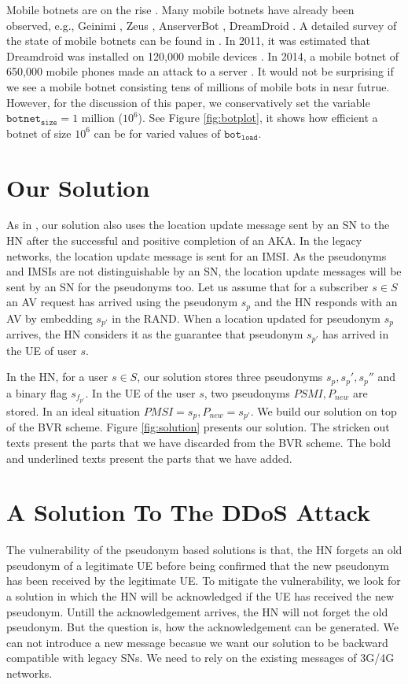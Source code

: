 \documentclass{llncs} %
\begin{document}
Mobile botnets are on the rise \cite{botnet_ccs09_symbian,botnet_usenix11,botnet_australia_2016}. Many mobile botnets have already been observed, e.g., Geinimi \cite{botnet_geinimi10}, Zeus \cite{botnet_zeus11}, AnserverBot \cite{botnet_anserverbot}, DreamDroid \cite{botnet_dreamdroid11}. A detailed survey of the state of mobile botnets can be found in \cite{botnet_threat15}. In 2011, it was estimated that Dreamdroid was installed on 120,000 mobile devices \cite{botnet_dreamdroid11}. In 2014, a mobile botnet of 650,000 mobile phones made an attack to a server \cite{chinese_spam}. It would not be surprising if we see a mobile botnet consisting tens of millions of mobile bots in near futrue. However, for the discussion of this paper, we conservatively set the variable $\texttt{botnet}_{\texttt{size}} = 1$ million ($10^6$). See Figure \ref{fig:botplot}, it shows how efficient a botnet of size $10^6$ can be for varied values of $\texttt{bot}_{\texttt{load}}$.


\section{Our Solution}
As in \cite{wisec17}, our solution also uses the location update message sent by an SN to the HN after the successful and positive completion of an AKA. In the legacy networks, the location update message is sent for an IMSI. As the pseudonyms and IMSIs are not distinguishable by an SN, the location update messages will be sent by an SN for the pseudonyms too. Let us assume that for a subscriber $s \in S$ an AV request has arrived using the pseudonym $s_{p}$ and the HN responds with an AV by embedding $s_{p'}$ in the RAND. When a location updated for pseudonym $s_p$ arrives, the HN considers it as the guarantee that pseudonym $s_{p'}$ has arrived in the UE of user $s$.

In the HN, for a user $s \in S$, our solution stores three pseudonyms $s_p,s_p',s_p''$ and a binary flag $s_{f_{p'}}$. In the UE of the user $s$, two pseudonyms $PSMI,P_{new}$ are stored. In an ideal situation $PMSI = s_{p}, P_{new} = s_{p'}$. We build our solution on top of the BVR scheme. Figure \ref{fig:solution} presents our solution. The stricken out texts present the parts that we have discarded from the BVR scheme. The bold and underlined texts present the parts that we have added. 


\section{A Solution To The DDoS Attack}
The vulnerability of the pseudonym based solutions is that, the HN forgets an old pseudonym of a legitimate UE before being confirmed that the new pseudonym has been received by the legitimate UE. To mitigate the vulnerability, we look for a solution in which the HN will be acknowledged if the UE has received the new pseudonym. Untill the acknowledgement arrives, the HN will not forget the old pseudonym. But the question is, how the acknowledgement can be generated. We can not introduce a new message becasue we want our solution to be backward compatible with legacy SNs. We need to rely on the existing messages of 3G/4G networks. 
\end{document}
